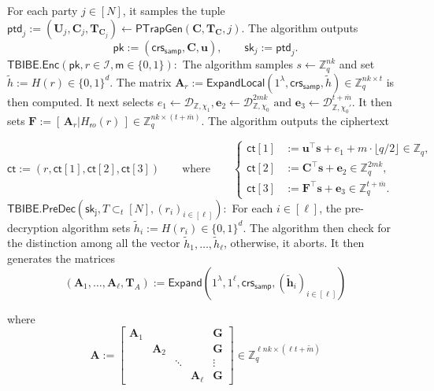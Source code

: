 For each party $j \in [N]$, it samples the tuple $\mathsf{ptd}_j := (\mathbf U_j,\mathbf C_j,\mathbf{T}_{\mathbf{C}_j}) \leftarrow \mathsf{PTrapGen}(\mathbf C,\mathbf T_{\mathbf{C}},j)$. The algorithm outputs {\setlength{\abovedisplayskip}{2pt}
\setlength{\abovedisplayshortskip}{2pt}
\[
\mathsf{pk}:=(\mathsf{crs}_{\mathsf{samp}},\mathbf C,\mathbf u),
\qquad
\mathsf{sk}_j:=\mathsf{ptd}_j.
\]
}
\noindent$\mathsf{TBIBE.Enc}(\mathsf{pk}, r \in \mathcal{I}, \mathsf{m} \in \{0,1\}):$ The algorithm samples $s \leftarrow \mathbb{Z}_q^{nk}$ and set $\tilde{h} := H(r) \in \{0,1\}^{d}$. The matrix $\mathbf{A}_r := \mathsf{ExpandLocal} (1^\lambda,\mathsf{crs}_{\mathsf{samp}},\tilde{h}) \in \mathbb{Z}_q^{nk \times t}$ is then computed. It next selects $e_1 \leftarrow \mathcal{D}_{\mathbb{Z},\chi_1}, \mathbf e_2 \leftarrow \mathcal{D}_{\mathbb{Z},\chi_0}^{2mk} \text{ and } \mathbf e_3 \leftarrow \mathcal{D}_{\mathbb{Z},\chi_0'}^{t+\overline{m}}$. It then sets  $\mathbf F := [\,\mathbf A_r | H_{\mathsf ro}(r)\,] \in \mathbb{Z}_q^{nk \times (t + \overline{m})}$. The algorithm outputs the ciphertext

{\setlength{\abovedisplayskip}{2pt}
\setlength{\abovedisplayshortskip}{2pt}
\[
\mathsf{ct}:=(r,\mathsf{ct}[1],\mathsf{ct}[2],\mathsf{ct}[3])
\qquad \text{where} \qquad
\left\{
\begin{aligned}
\mathsf{ct}[1] &:= \mathbf{u}^{\top}\mathbf{s}+e_1+m\cdot \lfloor q/2 \rfloor \in \mathbb{Z}_q,\\
\mathsf{ct}[2] &:= \mathbf{C}^{\top}\mathbf{s}+\mathbf{e}_2 \in \mathbb{Z}_q^{2mk},\\
\mathsf{ct}[3] &:= \mathbf{F}^{\top}\mathbf{s}+\mathbf{e}_3 \in \mathbb{Z}_q^{t + \overline{m}}.
\end{aligned}
\right.
\]}
$\mathsf{TBIBE.PreDec}(\mathsf{sk_j}, T \subset_{t} [N], (r_i)_{i \in [\ell]}):$ For each $i \in [\ell]$, the pre-decryption algorithm sets $\tilde{h}_i := H(r_i) \in \{0,1\}^d$. The algorithm then check for the distinction among all the vector $\tilde{h}_1, \dots, \tilde{h}_\ell$, otherwise, it aborts. It then generates the matrices
{\setlength{\abovedisplayskip}{2pt}
\setlength{\abovedisplayshortskip}{2pt}\[
    (\mathbf A_1,\ldots,\mathbf A_\ell,\mathbf T_A)
    := \mathsf{Expand}(1^\lambda,1^\ell,\mathsf{crs}_{\mathsf{samp}},(\tilde{\mathbf h}_i)_{i\in[\ell]})  
    \]}

where \[
    \mathbf{A}
    :=
    \left[
    \begin{array}{cccc|c}
        \mathbf{A}_1 &              &        &              & \mathbf{G} \\
                     & \mathbf{A}_2 &        &              & \mathbf{G} \\
                     &              & \ddots &              & \vdots     \\
                     &              &        & \mathbf{A}_\ell & \mathbf{G}
    \end{array}
    \right]
    \in \mathbb{Z}_q^{\ell nk \times (\ell t+\tilde{m})}
\]

